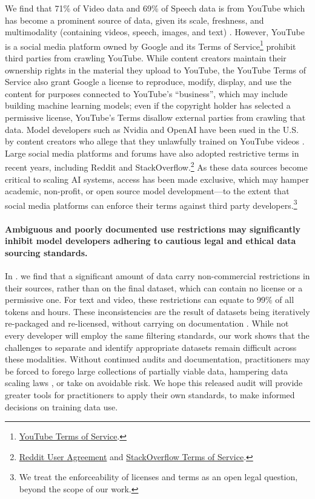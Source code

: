 We find that 71\% of Video data and 69\% of Speech data is from YouTube which has become a prominent source of data, given its scale, freshness, and multimodality (containing videos, speech, images, and text) \citep{abu2016youtube, NEURIPS2018_35309226, NEURIPS2020_2cd4e8a2, NEURIPS2023_5c61452d, coats2023dialect, li2023yodas}.
However, YouTube is a social media platform owned by Google and its Terms of Service\footnote{\href{https://www.youtube.com/static?template=terms}{YouTube Terms of Service}.} prohibit third parties from crawling YouTube.
While content creators maintain their ownership rights in the material they upload to YouTube, the YouTube Terms of Service also grant Google a license to reproduce, modify, display, and use the content for purposes connected to YouTube's ``business'', which may include building machine learning models; even if the copyright holder has selected a permissive license, YouTube's Terms   disallow external parties from crawling that data.
Model developers such as Nvidia and OpenAI have been sued in the U.S. by content creators who allege that they unlawfully trained on YouTube videos \citep{Cole2024, Skolnik2024}. 
Large social media platforms and forums have also adopted restrictive terms in recent years, including Reddit and StackOverflow.\footnote{\href{https://redditinc.com/policies/user-agreement-september-25-2023}{Reddit User Agreement} and \href{https://stackoverflow.com/legal/terms-of-service/public}{StackOverflow Terms of Service}.}
As these data sources become critical to scaling AI systems, access has been made exclusive, which may hamper academic, non-profit, or open source model development---to the extent that social media platforms can enforce their terms against third party developers.\footnote{We treat the enforceability of licenses and terms as an open legal question, beyond the scope of our work.}


\vspace{-2mm}
\paragraph{Ambiguous and poorly documented use restrictions may significantly inhibit model developers adhering to cautious legal and ethical data sourcing standards.}
In . we find that a significant amount of data carry non-commercial restrictions in their sources, rather than on the final dataset, which can contain no license or a permissive one.
For text and video, these restrictions can equate to 99\% of all tokens and hours.
These inconsistencies are the result of datasets being iteratively re-packaged and re-licensed, without carrying on documentation \citep{longpre2023data}.
While not every developer will employ the same filtering standards, our work shows that the challenges to separate and identify appropriate datasets remain difficult across these modalities.
Without continued audits and documentation, practitioners may be forced to forego large collections of partially viable data, hampering data scaling laws \citep{kaplan2020scaling}, or take on avoidable risk.
We hope this released audit will provide greater tools for practitioners to apply their own standards, to make informed decisions on training data use.


